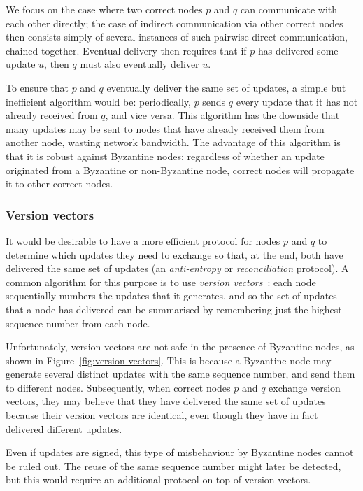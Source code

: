 \documentclass[sigplan,review]{acmart}
\begin{document}
We focus on the case where two correct nodes $p$ and $q$ can communicate with each other directly; the case of indirect communication via other correct nodes then consists simply of several instances of such pairwise direct communication, chained together.
Eventual delivery then requires that if $p$ has delivered some update $u$, then $q$ must also eventually deliver $u$.

To ensure that $p$ and $q$ eventually deliver the same set of updates, a simple but inefficient algorithm would be: periodically, $p$ sends $q$ every update that it has not already received from $q$, and vice versa.
This algorithm has the downside that many updates may be sent to nodes that have already received them from another node, wasting network bandwidth.
The advantage of this algorithm is that it is robust against Byzantine nodes: regardless of whether an update originated from a Byzantine or non-Byzantine node, correct nodes will propagate it to other correct nodes.

\subsubsection{Version vectors}\label{sec:vectors}

It would be desirable to have a more efficient protocol for nodes $p$ and $q$ to determine which updates they need to exchange so that, at the end, both have delivered the same set of updates (an \emph{anti-entropy} or \emph{reconciliation} protocol).
A common algorithm for this purpose is to use \emph{version vectors}~\cite{ParkerJr:1983}: each node sequentially numbers the updates that it generates, and so the set of updates that a node has delivered can be summarised by remembering just the highest sequence number from each node.

Unfortunately, version vectors are not safe in the presence of Byzantine nodes, as shown in Figure~\ref{fig:version-vectors}.
This is because a Byzantine node may generate several distinct updates with the same sequence number, and send them to different nodes.
Subsequently, when correct nodes $p$ and $q$ exchange version vectors, they may believe that they have delivered the same set of updates because their version vectors are identical, even though they have in fact delivered different updates.

Even if updates are signed, this type of misbehaviour by Byzantine nodes cannot be ruled out.
The reuse of the same sequence number might later be detected, but this would require an additional protocol on top of version vectors.
\end{document}
